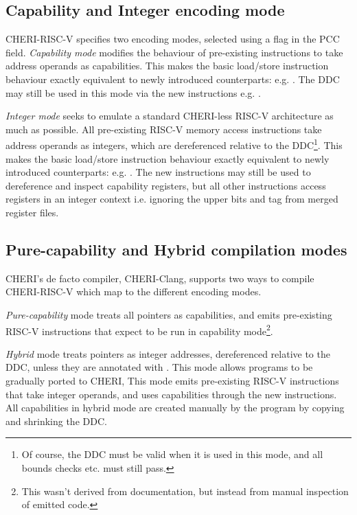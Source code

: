 \subsection{Capability and Integer encoding mode\label{chap:bg:subsec:cheriencodingmode}}
CHERI-RISC-V specifies two encoding modes, selected using a flag in the PCC  field.
\emph{Capability mode} modifies the behaviour of pre-existing instructions to take address operands as capabilities.
This makes the basic load/store instruction behaviour exactly equivalent to newly introduced counterparts: e.g. .
The DDC may still be used in this mode via the new instructions e.g. .

\emph{Integer mode} seeks to emulate a standard CHERI-less RISC-V architecture as much as possible.
All pre-existing RISC-V memory access instructions take address operands as integers, which are dereferenced relative to the DDC\footnote{Of course, the DDC must be valid when it is used in this mode, and all bounds checks etc. must still pass.}.
This makes the basic load/store instruction behaviour exactly equivalent to newly introduced counterparts: e.g. .
The new instructions may still be used to dereference and inspect capability registers, but all other instructions access registers in an integer context i.e. ignoring the upper bits and tag from merged register files.

\subsection{Pure-capability and Hybrid compilation modes}
CHERI's de facto compiler, CHERI-Clang\todocite{}, supports two ways to compile CHERI-RISC-V which map to the different encoding modes.

\emph{Pure-capability} mode treats all pointers as capabilities, and emits pre-existing RISC-V instructions that expect to be run in capability mode\footnote{This wasn't derived from documentation, but instead from manual inspection of emitted code.}.

\emph{Hybrid} mode treats pointers as integer addresses, dereferenced relative to the DDC, unless they are annotated with .
This mode allows programs to be gradually ported to CHERI, 
This mode emits pre-existing RISC-V instructions that take integer operands, and uses capabilities through the new instructions.
All capabilities in hybrid mode are created manually by the program by copying and shrinking the DDC.

